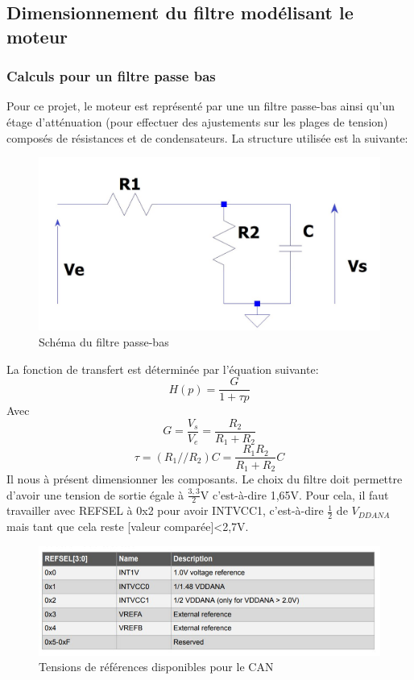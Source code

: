 \documentclass[a4paper]{article}
\begin{document}
\subsection{Dimensionnement du filtre modélisant le moteur}
	\subsubsection{Calculs pour un filtre passe bas}
	Pour ce projet, le moteur est représenté par une un filtre passe-bas ainsi qu’un étage d’atténuation (pour effectuer des ajustements sur les plages de tension) composés de résistances et de condensateurs. La structure utilisée est la suivante:	
	\begin{figure}[H]
	\centering
	\includegraphics[width=0.6\linewidth]{filtre_RC.jpg}
	\caption{Schéma du filtre passe-bas}
    \end{figure}
    La fonction de transfert est déterminée par l’équation suivante:
    \begin{equation}
		H(p)={\frac {G}{1+\tau p}}
	\end{equation}
	Avec
	\begin{equation}
		G={\frac {V_s}{V_e}}={\frac {R_{2}} {R_{1}+R_{2}}}
	\end{equation}
	\begin{equation}
		\tau=(R_{1}//R_{2}) C={\frac {R_{1}R_{2}} {R_{1}+R_{2}}}C
	\end{equation}
	Il nous à présent dimensionner les composants. Le choix du filtre doit permettre d’avoir une tension de sortie égale à $\frac {3,3}{2}$V c’est-à-dire 1,65V. Pour cela, il faut travailler avec REFSEL à 0x2 pour avoir INTVCC1, c’est-à-dire $\frac 12$ de $V_{DDANA}$ mais tant que cela reste [valeur comparée]\textless2,7V.\\
	\begin{figure}[H]
	\centering
	\includegraphics[width=0.8\linewidth]{Reference Selection_ADC.jpg}
	\caption{Tensions de références disponibles pour le CAN}
    \end{figure}
\end{document}
